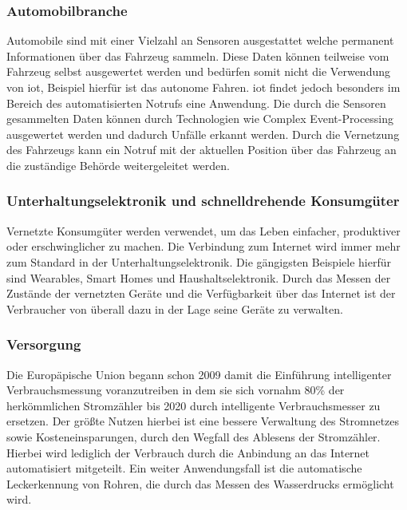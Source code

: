 \documentclass[a4paper, 12pt, twoside, headsepline=true]{scrartcl} %
\begin{document}
\subsubsection{Automobilbranche}
Automobile sind mit einer Vielzahl an Sensoren ausgestattet welche permanent Informationen über das Fahrzeug sammeln. Diese Daten können teilweise vom Fahrzeug selbst ausgewertet werden und bedürfen somit nicht die Verwendung von \ac{iot}, Beispiel hierfür ist das autonome Fahren. \ac{iot} findet  jedoch besonders im Bereich des automatisierten Notrufs eine Anwendung\cite[S.32-35]{iotDevelopments}. Die durch die Sensoren gesammelten Daten können durch Technologien wie Complex Event-Processing ausgewertet werden und dadurch Unfälle erkannt werden. Durch die Vernetzung des Fahrzeugs kann ein Notruf mit der aktuellen Position über das Fahrzeug an die zuständige Behörde weitergeleitet werden.

\subsubsection{Unterhaltungselektronik und schnelldrehende Konsumgüter}
Vernetzte Konsumgüter werden verwendet, um das Leben einfacher, produktiver oder erschwinglicher zu machen. Die Verbindung zum Internet  wird immer mehr zum Standard in der Unterhaltungselektronik.  Die gängigsten Beispiele hierfür sind Wearables, Smart Homes und Haushaltselektronik. Durch das Messen der Zustände der vernetzten Geräte und die Verfügbarkeit über das Internet ist der Verbraucher von überall dazu in der Lage seine Geräte zu verwalten\cite[S.37-41]{iotDevelopments}.

\subsubsection{Versorgung}
Die Europäpische Union begann schon 2009 damit die Einführung intelligenter Verbrauchsmessung voranzutreiben in dem sie sich vornahm 80\% der herkömmlichen Stromzähler bis 2020 durch intelligente Verbrauchsmesser zu ersetzen\cite[S.46-51]{iotDevelopments}. Der größte Nutzen hierbei ist eine bessere Verwaltung des Stromnetzes sowie Kosteneinsparungen, durch den Wegfall des Ablesens der Stromzähler. Hierbei wird lediglich der Verbrauch durch die Anbindung an das Internet automatisiert mitgeteilt.  Ein weiter Anwendungsfall ist die automatische Leckerkennung von Rohren, die durch das Messen des Wasserdrucks ermöglicht wird.
\end{document}
